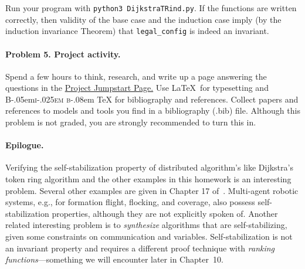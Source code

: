 \documentclass[11pt]{article}
\DeclareRobustCommand{\BibTeX}{%
  {\normalfont B\kern-.05em{\scshape i\kern-.025em b}\kern-.08em \TeX}%
}
\begin{document}
Run your program with \texttt{python3 DijkstraTRind.py}. If the functions are written correctly, then validity of the base case and the induction case imply (by the induction invariance Theorem) that \texttt{legal\_config} is indeed an invariant.

\paragraph{Problem 5. Project activity.} 
Spend a few hours to think, research, and write up a page answering the questions in the \href{https://mitras.ece.illinois.edu/ECE584/project.html}{Project Jumpstart Page.} Use \LaTeX\ for typesetting and \BibTeX for bibliography and references. Collect  papers and references to models and tools you find in a bibliography (.bib) file. Although this problem is not graded, you are strongly recommended to turn this in. 

\paragraph{Epilogue.} 
 Verifying the self-stabilization property of distributed algorithm's like Dijkstra's token ring algorithm and the other examples in this homework is an interesting problem. Several other examples are given in Chapter 17 of~\cite{Ghosh:2014:DSA}. Multi-agent robotic systems, e.g., for formation flight, flocking, and coverage, also possess self-stabilization properties, although they are not explicitly spoken of. Another related interesting problem is to {\em synthesize\/} algorithms that are self-stabilizing, given some constraints on communication and variables. Self-stabilization is not an invariant property and requires a different proof technique with {\em ranking functions\/}---something we will encounter later in Chapter~10.



\end{document}
